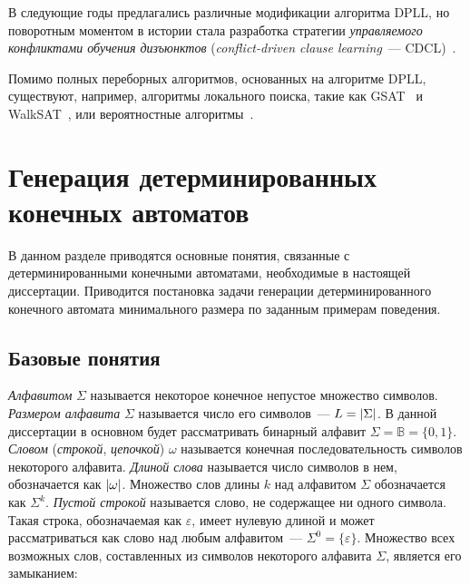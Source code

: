 В следующие годы предлагались различные модификации алгоритма DPLL, но поворотным моментом в истории стала разработка стратегии \emph{управляемого конфликтами обучения дизъюнктов} (\emph{conflict-driven clause learning}~--- CDCL)~\cite{DBLP:conf/iccad/SilvaS96,DBLP:journals/tc/Marques-SilvaS99}.

Помимо полных переборных алгоритмов, основанных на алгоритме DPLL, существуют, например, алгоритмы локального поиска, такие как GSAT~\cite{DBLP:conf/aaai/SelmanLM92} и WalkSAT~\cite{DBLP:conf/dimacs/SelmanKC93}, или вероятностные алгоритмы~\cite{DBLP:conf/focs/Schoning99}.



\section{Генерация детерминированных конечных автоматов} 
\label{sec:review:dfa-inf}

В данном разделе приводятся основные понятия, связанные с детерминированными конечными автоматами, необходимые в настоящей диссертации.
Приводится постановка задачи генерации детерминированного конечного автомата минимального размера по заданным примерам поведения.



\subsection{Базовые понятия} 
\label{sec:review:dfa-inf:dfa-def}

\emph{Алфавитом} $\Sigma$ называется некоторое конечное непустое множество символов.
\emph{Размером алфавита} $\Sigma$ называется число его символов~{---} $L = \lvert\Sigma\rvert$.
В данной диссертации в основном будет рассматривать бинарный алфавит $\Sigma = \mathbb{B} = \{0, 1\}$.
\emph{Словом} (\emph{строкой}, \emph{цепочкой}) $\omega$ называется конечная последовательность символов некоторого алфавита. 
\emph{Длиной слова} называется число символов в нем, обозначается как $\lvert\omega\rvert$.
Множество слов длины $k$ над алфавитом $\Sigma$ обозначается как $\Sigma^{k}$.
\emph{Пустой строкой} называется слово, не содержащее ни одного символа.
Такая строка, обозначаемая как $\varepsilon$, имеет нулевую длиной и может рассматриваться как слово над любым алфавитом~{---} $\Sigma^{0}=\{\varepsilon\}$.
Множество всех возможных слов, составленных из символов некоторого алфавита $\Sigma$, является его замыканием:

